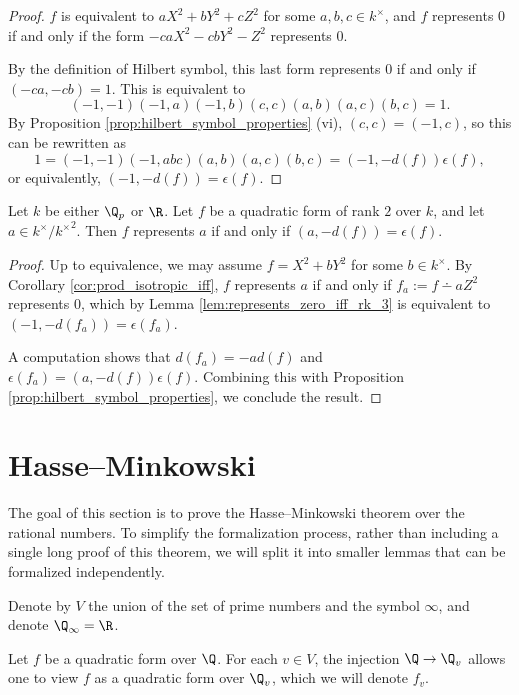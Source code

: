 \begin{proof}
$f$ is equivalent to $aX^2 + bY^2 + cZ^2$ for some $a, b, c \in k^\times$, and $f$ represents $0$ if and only if the form $-caX^2 -cbY^2 - Z^2$ represents $0$.

By the definition of Hilbert symbol, this last form represents $0$ if and only if $(-ca, -cb) = 1$.
This is equivalent to
\[ (-1, -1)(-1, a)(-1, b)(c, c)(a, b)(a, c)(b, c) = 1. \]
By Proposition \ref{prop:hilbert_symbol_properties} (vi), $(c, c) = (-1, c)$, so this can be rewritten as 
\[ 1 = (-1, -1)(-1, abc)(a, b)(a, c)(b, c) = (-1, -d(f))\epsilon(f), \]
or equivalently, $(-1, -d(f)) = \epsilon(f)$.
\end{proof}

\begin{lemma}\label{lem:represents_iff_rk_2}
\leanok
{}
Let $k$ be either $\Q_p$ or $\R$. Let $f$ be a quadratic form of rank $2$ over $k$, and let $a \in k^\times / {k^\times}^2$. Then $f$ represents $a$ if and only if $(a, -d(f)) = \epsilon(f)$.
\end{lemma}
\begin{proof}
Up to equivalence, we may assume $f = X^2 + bY^2$ for some $b \in k^\times$. By Corollary \ref{cor:prod_isotropic_iff}, $f$ represents $a$ if and only if $f_a := f \dotminus aZ^2$ represents $0$, which by Lemma \ref{lem:represents_zero_iff_rk_3} is equivalent to $(-1, -d(f_a)) = \epsilon(f_a)$.

A computation shows that $d(f_a) = -a d(f)$ and $\epsilon(f_a) = (a, -d(f)) \epsilon (f)$. Combining this with Proposition \ref{prop:hilbert_symbol_properties}, we conclude the result.
\end{proof}

\section{Hasse--Minkowski}\label{sec:Hasse--Minkowski}

The goal of this section is to prove the Hasse--Minkowski theorem over the rational numbers. To simplify the formalization process, rather than including a single long proof of this theorem, we will split it into smaller lemmas that can be formalized independently.

Denote by $V$ the union of the set of prime numbers and the symbol $\infty$, and denote $\Q_\infty = \R$. 

Let $f$ be a quadratic form over $\Q$. For each $v \in V$, the injection $\Q \to \Q_v$ allows one to view $f$ as a quadratic form over $\Q_v$, which we will denote $f_v$.

